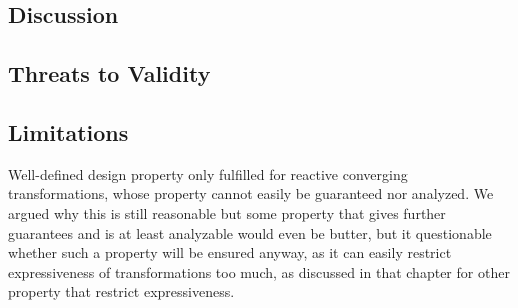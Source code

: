 \subsection{Discussion}


\subsection{Threats to Validity}


\subsection{Limitations}
Well-defined design property only fulfilled for reactive converging transformations, whose property cannot easily be guaranteed nor analyzed.
We argued why this is still reasonable but some property that gives further guarantees and is at least analyzable would even be butter, but it questionable whether such a property will be ensured anyway, as it can easily restrict expressiveness of transformations too much, as discussed in that chapter for other property that restrict expressiveness.
